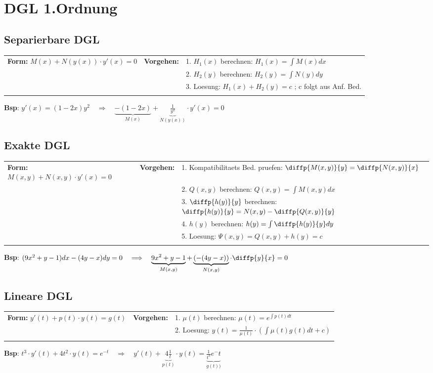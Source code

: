 \section{DGL 1.Ordnung}

\subsection{Separierbare DGL}
\begin{tabular}{p{6cm}p{2cm}p{10.5cm}}
\textbf{Form:} $M(x) + N(y(x))\cdot y'(x) = 0$ &
\textbf{Vorgehen:}              &

1. $H_1(x)$ berechnen: $H_1(x) = \int M(x) dx$ \\ &&
2. $H_2(y)$ berechnen: $H_2(y) = \int N(y)dy$ \\ &&
3. Loesung: $H_1(x) + H_2(y) = c$ ; c folgt aus Anf. Bed.\\\\
\end{tabular}
\textbf{Bsp}: $y'(x) = (1-2x)y^2 \quad \Longrightarrow \quad \underbrace{-(1-2x)}_{M(x)} + \underbrace{\frac{1}{y^2}}_{N(y(x))} \cdot y'(x) = 0$

\subsection{Exakte DGL}
\begin{tabular}{p{6cm}p{2cm}p{10.5cm}}
\textbf{Form:} $M(x,y) + N(x,y)\cdot y'(x) = 0$ &
\textbf{Vorgehen:}              &

1. Kompatibilitaets Bed. pruefen: $\diffp{M(x,y)}{y} = \diffp{N(x,y)}{x}$ \\ &&
2. $Q(x,y)$ berechnen: $Q(x,y) = \int M(x,y) dx$ \\ &&
3. $\diffp{h(y)}{y}$ berechnen: $\diffp{h(y)}{y} = N(x,y) - \diffp{Q(x,y)}{y}$ \\ &&
4. $h(y)$ berechnen: $h(y) = \int \diffp{h(y)}{y} dy $ \\ &&
5. Loesung: $\Psi(x,y) = Q(x,y) + h(y) = c $ \\ &&
\end{tabular}
\textbf{Bsp}: $(9x^2 + y -1)dx - (4y -x)dy = 0 \quad \Longrightarrow \quad  \underbrace{9x^2 +y -1}_{M(x,y)} + \underbrace{(-(4y -x))}_{N(x,y)} \cdot \diffp{y}{x} = 0$

\subsection{Lineare DGL}
\begin{tabular}{p{6cm}p{2cm}p{10.5cm}}
\textbf{Form:} $y'(t) + p(t) \cdot y(t) = g(t)$ &
\textbf{Vorgehen:}              &

1. $\mu(t)$ berechnen: $\mu(t) = e^{\int p(t) dt}$ \\ &&
2. Loesung: $y(t) = \frac{1}{\mu(t)} \cdot ( \int \mu(t) g(t) dt +c)$ \\ &&
\end{tabular}
\textbf{Bsp}: $t^3 \cdot y'(t) + 4 t^2 \cdot y(t) = e^{-t} \quad \Longrightarrow \quad y'(t) + \underbrace{4 \frac{1}{t}}_{p(t)} \cdot y(t) = \underbrace{\frac{1}{t^3} e^-t}_{g(t))}$